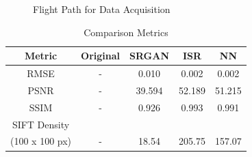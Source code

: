 \documentclass[conference]{IEEEtran}
\begin{document}
\begin{figure}[htbp]
    \caption{Flight Path for Data Acquisition}
    \label{fig2}
\end{figure}





\setlength{\tabcolsep}{10pt} %
\renewcommand{\arraystretch}{1.5} %
\begin{table}[h!]
    \caption{Comparison Metrics}
    \centering
     \begin{tabular}{ c c c c c } 
     \hline
     Metric & Original & SRGAN & ISR & NN \\ [1ex] 
     \hline
     RMSE & - & 0.010 & 0.002 & 0.002 \\ 
     PSNR & - & 39.594 & 52.189 & 51.215 \\
     SSIM & - & 0.926 & 0.993 & 0.991 \\
     SIFT Density \\ (100 x 100 px) & - & 18.54 & 205.75 & 157.07 \\
     \hline
     \end{tabular}
\end{table}
\end{document}
